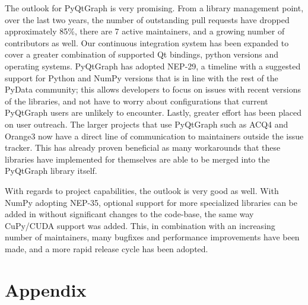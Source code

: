 \documentclass[journal]{vgtc}                %
\begin{document}
The outlook for PyQtGraph is very promising.  From a library management point, over the last two years, the number of outstanding pull requests have dropped approximately 85\%, there are 7 active maintainers, and a growing number of contributors as well.  Our continuous integration system has been expanded to cover a greater combination of supported Qt bindings, python versions and operating systems.  PyQtGraph has adopted NEP-29, a timeline with a suggested support for Python and NumPy versions that is in line with the rest of the PyData community; this allows developers to focus on issues with recent versions of the libraries, and not have to worry about configurations that current PyQtGraph users are unlikely to encounter.  Lastly, greater effort has been placed on user outreach.  The larger projects that use PyQtGraph such as ACQ4 and Orange3 now have a direct line of communication to maintainers outside the issue tracker.  This has already proven beneficial as many workarounds that these libraries have implemented for themselves are able to be merged into the PyQtGraph library itself.

With regards to project capabilities, the outlook is very good as well.  With NumPy adopting NEP-35, optional support for more specialized libraries can be added in without significant changes to the code-base, the same way CuPy/CUDA support was added.  This, in combination with an increasing number of maintainers, many bugfixes and performance improvements have been made, and a more rapid release cycle has been adopted.

\color{black}

%

%
%
%

\section{Appendix}
\end{document}
